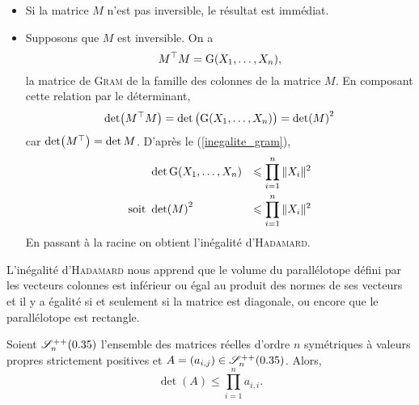 \begin{preuve}
    \begin{itemize}
        \item Si la matrice $M$ n'est pas inversible, le résultat est immédiat. 
        \item Supposons que $M$ est inversible. On a 
        $$M^\top M = \mathrm{G}(X_1, \dots, X_n),$$ 
        la matrice de \textsc{Gram} de la famille des colonnes de la matrice $M$. 
        En composant cette relation par le déterminant, 
        $$\det(M^\top M) = \det \big( \mathrm{G}(X_1, \dots, X_n) \big) = \det(M)^2 $$
        car $\det(M^\top) = \det M$.
        D'après le (\ref{inegalite_gram}), 
        \begin{align*}
            &\det \mathrm{G}(X_1, \dots, X_n) &\leqslant \prod_{i=1}^n \Vert X_i \Vert^2 \\
            \text{soit } & \det (M)^2 &\leqslant \prod_{i=1}^n \Vert X_i \Vert^2
        \end{align*}
        En passant à la racine on obtient l'inégalité d'\textsc{Hadamard}.
    \end{itemize}
\end{preuve}


L'inégalité d'\textsc{Hadamard} nous apprend que le volume du parallélotope défini par les vecteurs colonnes est inférieur ou égal au produit des normes de ses vecteurs et il y a égalité si et seulement si la matrice est diagonale, ou encore que le parallélotope est rectangle. 

\begin{prop}{}
    Soient $\mathscr{S}_n ^{++} (0.35)$ l'ensemble des matrices réelles d'ordre $n$ symétriques à valeurs propres strictement positives et $A = (a_{i,j}) \in \mathscr{S}_n ^{++} (0.35)$. Alors,
    $$\det(A) \leqslant \prod_{i=1}^{n} a_{i,i}.$$
\end{prop}


